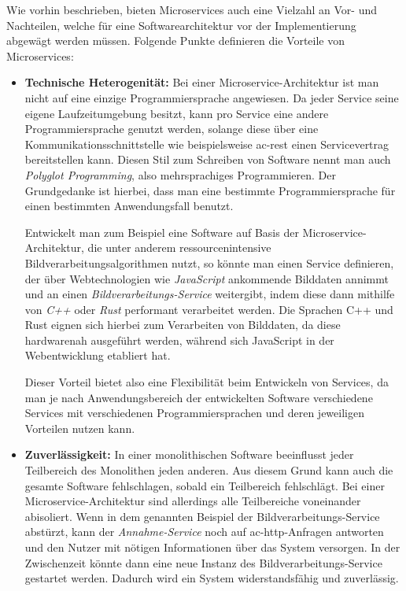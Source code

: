     Wie vorhin beschrieben, bieten Microservices auch eine Vielzahl an Vor- und Nachteilen, welche für eine Softwarearchitektur vor der Implementierung abgewägt werden müssen. Folgende Punkte definieren die Vorteile von Microservices:
    \begin{itemize}
      \item \textbf{Technische Heterogenität:} Bei einer Microservice-Architektur ist man nicht auf eine einzige Programmiersprache angewiesen. Da jeder Service seine eigene Laufzeitumgebung besitzt, kann pro Service eine andere Programmiersprache genutzt werden, solange diese über eine Kommunikationsschnittstelle wie beispielsweise \gls{ac-rest} einen Servicevertrag bereitstellen kann. Diesen Stil zum Schreiben von Software nennt man auch \emph{Polyglot Programming}, also mehrsprachiges Programmieren. Der Grundgedanke ist hierbei, dass man eine bestimmte Programmiersprache für einen bestimmten Anwendungsfall benutzt.
      
      Entwickelt man zum Beispiel eine Software auf Basis der Microservice-Architektur, die unter anderem ressourcenintensive Bildverarbeitungsalgorithmen nutzt, so könnte man einen Service definieren, der über Webtechnologien wie \emph{JavaScript} ankommende Bilddaten annimmt und an einen \emph{Bildverarbeitungs-Service} weitergibt, indem diese dann mithilfe von \emph{C++} oder \emph{Rust} performant verarbeitet werden. Die Sprachen C++ und Rust eignen sich hierbei zum Verarbeiten von Bilddaten, da diese hardwarenah ausgeführt werden, während sich JavaScript in der Webentwicklung etabliert hat.
      
      Dieser Vorteil bietet also eine Flexibilität beim Entwickeln von Services, da man je nach Anwendungsbereich der entwickelten Software verschiedene Services mit verschiedenen Programmiersprachen und deren jeweiligen Vorteilen nutzen kann.

      \item \textbf{Zuverlässigkeit:} In einer monolithischen Software beeinflusst jeder Teilbereich des Monolithen jeden anderen. Aus diesem Grund kann auch die gesamte Software fehlschlagen, sobald ein Teilbereich fehlschlägt. Bei einer Microservice-Architektur sind allerdings alle Teilbereiche voneinander abisoliert. Wenn in dem genannten Beispiel der Bildverarbeitungs-Service abstürzt, kann der \emph{Annahme-Service} noch auf \gls{ac-http}-Anfragen antworten und den Nutzer mit nötigen Informationen über das System versorgen. In der Zwischenzeit könnte dann eine neue Instanz des Bildverarbeitungs-Service gestartet werden. Dadurch wird ein System widerstandsfähig und zuverlässig.
      

\end{itemize}
